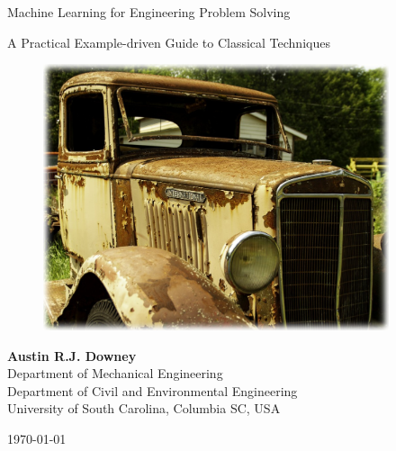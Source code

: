 \documentclass[12pt,letter]{article}
\begin{document}
\thispagestyle{firstpagestyle}

\begin{center}
	{\fontsize{33}{100}\selectfont Machine Learning for Engineering Problem Solving}

	\vspace{1cm}

	\begin{center}
	\begin{minipage}{0.75\textwidth}
		\centering
       	{\LARGE{} A Practical Example-driven Guide to Classical Techniques}
	\end{minipage}
	\end{center}

	\vspace{3cm}
	
	\begin{figure}[H]
		\centering
		\includegraphics[width=4.0in]{figures/truck}
		\label{fig:title_figure}
	\end{figure} 
	
	\vspace{2cm}
	
	\textbf{Austin R.J. Downey}\\ Department of Mechanical Engineering \\ Department of Civil and Environmental Engineering \\ University of South Carolina, Columbia SC, USA 
	








	\vspace*{\fill}
	
	\today


\end{center}
\end{document}
